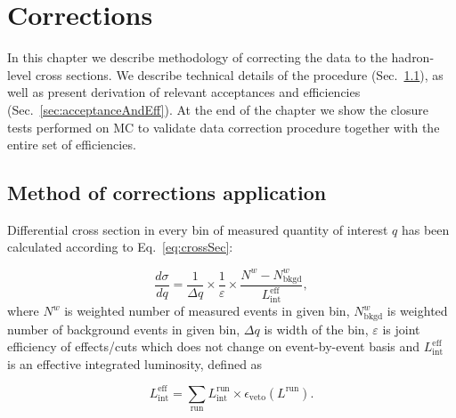 

\chapter{Corrections}\label{chap:corrections}

In this chapter we describe methodology of correcting the data to the hadron-level cross sections. We describe technical details of the procedure (Sec.~\ref{sec:correctionProcedure}), as well as present derivation of relevant acceptances and efficiencies (Sec.~\ref{sec:acceptanceAndEff}). At the end of the chapter we show the closure tests performed on MC to validate data correction procedure together with the entire set of efficiencies.


\section{Method of corrections application}\label{sec:correctionProcedure}

Differential cross section in every bin of measured quantity of interest $q$ has been calculated according to Eq.~\eqref{eq:crossSec}:

\begin{equation}\label{eq:crossSec} 
  \frac{d\sigma}{dq} = \frac{1}{\Delta q} \times \frac{1}{\varepsilon} \times \frac{N^{\mathit{w}}-N^{\mathit{w}}_\textrm{bkgd}}{\mathit{L}_{\textrm{int}}^{\textrm{eff}}},
\end{equation}%
%
where $N^{w}$ is weighted number of measured events in given bin, $N^{w}_{\text{bkgd}}$ is weighted number of background events in given bin, $\Delta q$ is width of the bin, $\varepsilon$ is joint efficiency of effects/cuts which does not change on event-by-event basis and $\mathit{L}_{\textrm{int}}^{\textrm{eff}}$ is an effective integrated luminosity, defined as


\begin{equation}\label{eq:effectiveLumi}
	\mathit{L}_{\textrm{int}}^{\textrm{eff}} = \sum\limits_{\textrm{run}}\mathit{L}_{\textrm{int}}^{\textrm{run}} \times \epsilon_{\textrm{veto}}(L^{\textrm{run}}).
\end{equation}

